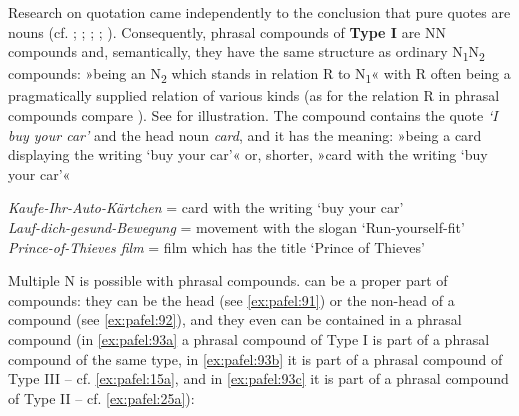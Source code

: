 \documentclass[output=paper]{LSP/langsci}
\begin{document}
Research on quotation came independently to the conclusion that pure quotes are nouns (cf. \citealt[98 footnote 1]{Jespersen1924}; \citealt[Kap. III.2.2.1]{Klockow1980}; \citealt[153]{AN04}; \citealt{Pafel2007, Pafel2011}; \citealt[§5]{Vries2008}). Consequently, phrasal compounds of \textbf{Type I} are NN compounds and, semantically, they have the same structure as ordinary N\textsubscript{1}N\textsubscript{2} compounds: »being an N\textsubscript{2} which stands in relation R to N\textsubscript{1}« with R often being a pragmatically supplied relation of various kinds (as for the relation R in phrasal compounds compare \citealt{Meibauer2015}). See  for illustration. The compound contains the quote \textit{`I buy your car'} and the head noun \textit{card}, and it has the meaning: »being a card displaying the writing `buy your car'« or, shorter, »card with the writing `buy your car'«


\ea
      \ea\label{ex:pafel:9a}
      \glt  \textit{Kaufe-Ihr-Auto-Kärtchen} = card with the writing `buy your car’\\ 
      \ex\label{ex:pafel:9b}
      \glt  \textit{Lauf-dich-gesund-Bewegung} = movement with the slogan ‘Run-yourself-fit’\\ 
      \ex\label{ex:pafel:9c}
      \glt  \textit{Prince-of-Thieves film} = film which has the title ‘Prince of Thieves’\\
     \z
\z

Multiple N  is possible with phrasal compounds.  can be a proper part of compounds: they can be the head (see \ref{ex:pafel:91}) or the non-head of a compound (see \ref{ex:pafel:92}), and they even can be contained in a phrasal compound (in \ref{ex:pafel:93a} a phrasal compound of Type I is part of a phrasal compound of the same type, in \ref{ex:pafel:93b} it is part of a phrasal compound of Type III – cf. \ref{ex:pafel:15a}, and in \ref{ex:pafel:93c} it is part of a phrasal compound of Type II – cf. \ref{ex:pafel:25a}):
\end{document}
